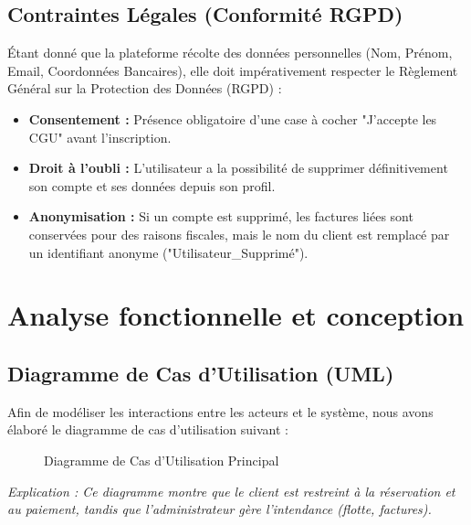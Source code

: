 \documentclass[12pt, a4paper]{report}
\begin{document}
\section{Contraintes Légales (Conformité RGPD)}
Étant donné que la plateforme récolte des données personnelles (Nom, Prénom, Email, Coordonnées Bancaires), elle doit impérativement respecter le Règlement Général sur la Protection des Données (RGPD) :
\begin{itemize}
    \item \textbf{Consentement :} Présence obligatoire d'une case à cocher "J'accepte les CGU" avant l'inscription.
    \item \textbf{Droit à l'oubli :} L'utilisateur a la possibilité de supprimer définitivement son compte et ses données depuis son profil.
    \item \textbf{Anonymisation :} Si un compte est supprimé, les factures liées sont conservées pour des raisons fiscales, mais le nom du client est remplacé par un identifiant anonyme ("Utilisateur\_Supprimé").
\end{itemize}

\chapter{Analyse fonctionnelle et conception}

\section{Diagramme de Cas d'Utilisation (UML)}
Afin de modéliser les interactions entre les acteurs et le système, nous avons élaboré le diagramme de cas d'utilisation suivant :

\begin{figure}[H]
    \centering
    \caption{Diagramme de Cas d'Utilisation Principal}
\end{figure}
\textit{Explication : Ce diagramme montre que le client est restreint à la réservation et au paiement, tandis que l'administrateur gère l'intendance (flotte, factures).}
\end{document}
